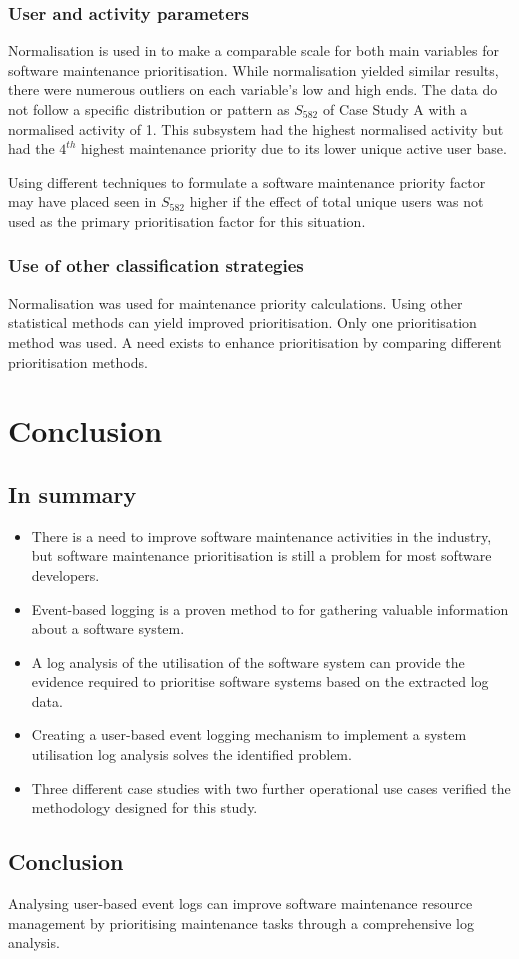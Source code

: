 \subsubsection{User and activity parameters}
\par Normalisation is used in  to make a comparable scale for both main variables for software maintenance prioritisation. While normalisation yielded similar results, there were numerous outliers on each variable's low and high ends. The data do not follow a specific distribution or pattern as $S_{582}$ of Case Study A with a normalised activity of 1. This subsystem had the highest normalised activity but had the $4^{th}$ highest maintenance priority due to its lower unique active user base. \par Using different techniques to formulate a software maintenance priority factor may have placed seen in $S_{582}$ higher if the effect of total unique users was not used as the primary prioritisation factor for this situation. 

\subsubsection{Use of other classification strategies}
Normalisation was used for maintenance priority calculations. Using other statistical methods can yield improved prioritisation. Only one prioritisation method was used. A need exists to enhance prioritisation by comparing different prioritisation methods.

\section{Conclusion}

\subsection{In summary}
\begin{itemize}
	\item There is a need to improve software maintenance activities in the industry, but software maintenance prioritisation is still a problem for most software developers.
	\item Event-based logging is a proven method to for gathering valuable information about a software system.
	\item A log analysis of the utilisation of the software system can provide the evidence required to prioritise software systems based on the extracted log data.
	\item Creating a user-based event logging mechanism to implement a system utilisation log analysis solves the identified problem.
	\item Three different case studies with two further operational use cases verified the methodology designed for this study.
\end{itemize}

\subsection{Conclusion}
Analysing user-based event logs can improve software maintenance resource management by prioritising maintenance tasks through a comprehensive log analysis.